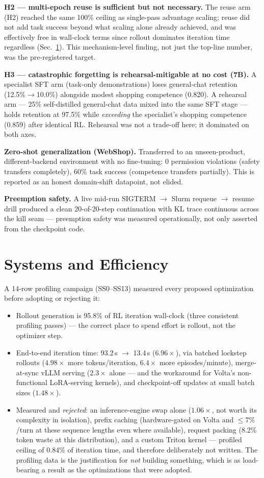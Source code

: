 \documentclass[11pt]{article}
\begin{document}
\textbf{H2 --- multi-epoch reuse is sufficient but not necessary.} The reuse arm
(H2) reached the same 100\% ceiling as single-pass advantage scaling; reuse did
not add task success beyond what scaling alone already achieved, and was
effectively free in wall-clock terms since rollout dominates iteration time
regardless (Sec.~\ref{sec:systems}). This mechanism-level finding, not just the
top-line number, was the pre-registered target.

\textbf{H3 --- catastrophic forgetting is rehearsal-mitigable at no cost (7B).} A
specialist SFT arm (task-only demonstrations) loses general-chat retention
(12.5\%$\rightarrow$10.0\%) alongside modest shopping competence (0.820). A
rehearsal arm --- 25\% self-distilled general-chat data mixed into the same SFT
stage --- holds retention at 97.5\% while \emph{exceeding} the specialist's
shopping competence (0.859) after identical RL. Rehearsal was not a trade-off
here; it dominated on both axes.

\textbf{Zero-shot generalization (WebShop).} Transferred to an unseen-product,
different-backend environment with no fine-tuning: 0 permission violations
(safety transfers completely), 60\% task success (competence transfers
partially). This is reported as an honest domain-shift datapoint, not elided.

\textbf{Preemption safety.} A live mid-run SIGTERM $\rightarrow$ Slurm requeue
$\rightarrow$ resume drill produced a clean 20-of-20-step continuation with KL
trace continuous across the kill seam --- preemption safety was measured
operationally, not only asserted from the checkpoint code.

\section{Systems and Efficiency}
\label{sec:systems}
A 14-row profiling campaign (SS0--SS13) measured every proposed optimization
before adopting or rejecting it:
\begin{itemize}
\item Rollout generation is 95.8\% of RL iteration wall-clock (three consistent
profiling passes) --- the correct place to spend effort is rollout, not the
optimizer step.
\item End-to-end iteration time: 93.2\,s $\rightarrow$ 13.4\,s ($6.96\times$),
via batched lockstep rollouts ($4.98\times$ more tokens/iteration, $6.4\times$
more episodes/minute), merge-at-sync vLLM serving ($2.3\times$ alone --- and the
workaround for Volta's non-functional LoRA-serving kernels), and checkpoint-off
updates at small batch sizes ($1.48\times$).
\item Measured and \emph{rejected}: an inference-engine swap alone ($1.06\times$,
not worth its complexity in isolation), prefix caching (hardware-gated on Volta
and $\le 7\%$/turn at these sequence lengths even where available), request
packing (8.2\% token waste at this distribution), and a custom Triton kernel ---
profiled ceiling of 0.84\% of iteration time, and therefore deliberately not
written. The profiling data is the justification for \emph{not} building
something, which is as load-bearing a result as the optimizations that were
adopted.
\end{itemize}
\end{document}
